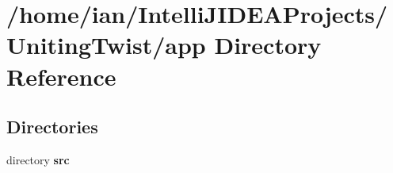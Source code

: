 \section{/home/ian/\+Intelli\+J\+I\+D\+E\+A\+Projects/\+Uniting\+Twist/app Directory Reference}
\label{dir_6e856512c10a4f8fd700a02721e137be}
\subsection*{Directories}
\begin{DoxyCompactItemize}
\item 
directory \textbf{ src}
\end{DoxyCompactItemize}
